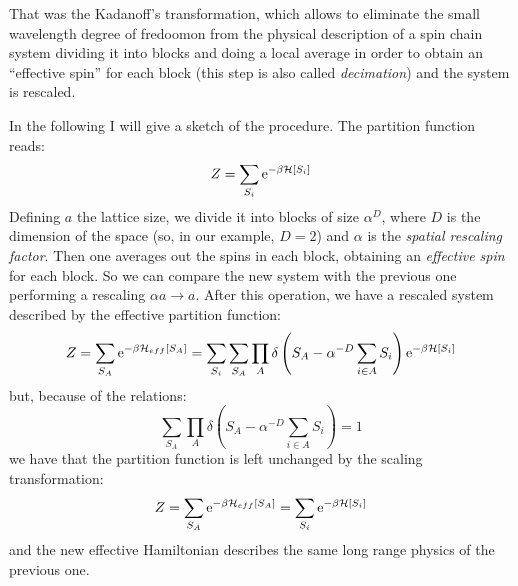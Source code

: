 That was the Kadanoff's transformation, which allows to eliminate the small wavelength degree of fredoomon from the physical description of 
a spin chain system dividing it into blocks and doing a local average in order to obtain an ``effective spin'' for each block (this step is also called \emph{decimation}) and
the system is rescaled.

In the following I will give a sketch of the procedure. The partition function reads:
\begin{equation}
 Z = \sum_{S_i} \operatorname{e}^{-\beta\mathcal{H}[S_i]}
\end{equation}
Defining $a$ the lattice size, we divide it into blocks of size $\alpha^D$, where $D$ is the dimension of the space (so, in our example, $D=2$)
and $\alpha$ is the \emph{spatial rescaling factor}. Then one averages out the spins in each block, obtaining an
\emph{effective spin} for each block. 
So we can compare the new system with the previous one performing a rescaling $\alpha a \to a$.
After this operation, we have a rescaled system described by the effective partition function:
\begin{equation}
 Z = \sum_{S_A} \operatorname{e}^{-\beta\mathcal{H}_{eff}[S_A]} = \sum_{S_i} \sum_{S_A}\prod_A\delta\left(S_A - \alpha^{-D}\sum_{i \in A}{S_i} \right)\operatorname{e}^{-\beta\mathcal{H}[S_i]}
\end{equation}
but, because of the relations:
$$\sum_{S_A}\prod_A\delta\left(S_A - \alpha^{-D}\sum_{i \in A}{S_i} \right) = 1$$
we have that the partition function is left unchanged by the scaling transformation:
\begin{equation}
 Z = \sum_{S_A} \operatorname{e}^{-\beta\mathcal{H}_{eff}[S_A]} = \sum_{S_i}\operatorname{e}^{-\beta\mathcal{H}[S_i]}
\end{equation}
and the new effective Hamiltonian describes the same long range physics of the previous one.

